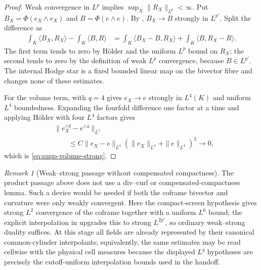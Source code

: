 \documentclass[11pt]{article}
\theoremstyle{definition}
\theoremstyle{remark}
\newtheorem{remark}[remark]{Remark}
\begin{document}
\begin{proof}
Weak convergence in $L^p$ implies $\sup_X\|R_X\|_{L^p}<\infty$.  Put
$B_X=\Phi(e_X\wedge e_X)$ and $B=\Phi(e\wedge e)$.  By
, $B_X\to B$ strongly in $L^{p'}$.
Split the difference as
\begin{align}
 \int_K\langle B_X,R_X\rangle-\int_K\langle B,R\rangle
 &=\int_K\langle B_X-B,R_X\rangle
   +\int_K\langle B,R_X-R\rangle.
 \label{eq:supp-pairing-split}
\end{align}
The first term tends to zero by H\"older and the uniform $L^p$ bound on
$R_X$; the second tends to zero by the definition of weak $L^p$ convergence,
because $B\in L^{p'}$.  The internal Hodge star is a fixed bounded linear map
on the bivector fibre and changes none of these estimates.

For the volume term,  with $q=4$ gives
$e_X\to e$ strongly in $L^4(K)$ and uniform $L^4$ boundedness.  Expanding the
fourfold difference one factor at a time and applying H\"older with four
$L^4$ factors gives
\begin{align}
 &\|e_X^{\wedge4}-e^{\wedge4}\|_{L^1} \\
 &\qquad\le C\|e_X-e\|_{L^4}
 (\|e_X\|_{L^4}+\|e\|_{L^4})^3\longrightarrow0,
\end{align}
which is \eqref{eq:supp-volume-strong}.
\end{proof}

\begin{remark}[Weak--strong passage without compensated compactness]
\label{rem:supp-no-divcurl}
The product passage above does not use a div--curl or compensated-compactness
lemma.  Such a device would be needed if both the coframe bivector and curvature
were only weakly convergent.  Here the compact-screen hypothesis gives strong
$L^2$ convergence of the coframe together with a uniform $L^6$ bound; the
explicit interpolation in  upgrades this
to strong $L^{2p'}$, so ordinary weak--strong duality suffices.  At this stage
all fields are already represented by their canonical common-cylinder
interpolants; equivalently, the same estimates may be read cellwise with the
physical cell measures because the displayed $L^q$ hypotheses are precisely
the cutoff-uniform interpolation bounds used in the handoff.
\end{remark}
\end{document}
